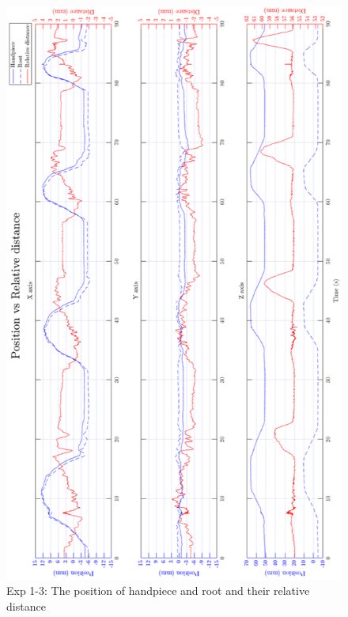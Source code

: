 \begin{figure}[htbp]
\begin{center}
\includegraphics[width=0.9\linewidth]{Images/exp/exp1_3_1.png}
\caption{Exp 1-3: The position of handpiece and root and their relative distance}
\label{fig: exp1_3_1}
\end{center}
\end{figure}		

